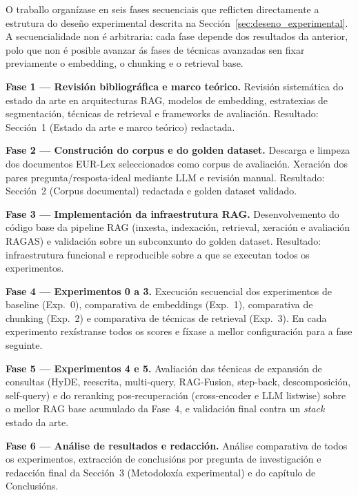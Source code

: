 \documentclass[11pt, a4paper, oneside]{report}
\begin{document}
O traballo organízase en seis fases secuenciais que reflicten directamente a estrutura
do deseño experimental descrita na Sección~\ref{sec:deseno_experimental}. A
secuencialidade non é arbitraria: cada fase depende dos resultados da anterior, polo
que non é posible avanzar ás fases de técnicas avanzadas sen fixar previamente o
embedding, o chunking e o retrieval base.

\textbf{Fase 1 — Revisión bibliográfica e marco teórico.} Revisión sistemática do
estado da arte en arquitecturas RAG, modelos de embedding, estratexias de segmentación,
técnicas de retrieval e frameworks de avaliación. Resultado: Sección~1 (Estado da arte
e marco teórico) redactada.

\textbf{Fase 2 — Construción do corpus e do golden dataset.} Descarga e limpeza dos
documentos EUR-Lex seleccionados como corpus de avaliación. Xeración dos pares
pregunta/resposta-ideal mediante LLM e revisión manual. Resultado: Sección~2 (Corpus
documental) redactada e golden dataset validado.

\textbf{Fase 3 — Implementación da infraestrutura RAG.} Desenvolvemento do código
base da pipeline RAG (inxesta, indexación, retrieval, xeración e avaliación RAGAS) e
validación sobre un subconxunto do golden dataset. Resultado: infraestrutura funcional
e reproducible sobre a que se executan todos os experimentos.

\textbf{Fase 4 — Experimentos 0 a 3.} Execución secuencial dos experimentos de
baseline (Exp.~0), comparativa de embeddings (Exp.~1), comparativa de chunking
(Exp.~2) e comparativa de técnicas de retrieval (Exp.~3). En cada experimento
rexístranse todos os scores e fíxase a mellor configuración para a fase seguinte.

\textbf{Fase 5 — Experimentos 4 e 5.} Avaliación das técnicas de expansión de consultas
(HyDE, reescrita, multi-query, RAG-Fusion, step-back, descomposición, self-query) e do
reranking pos-recuperación (cross-encoder e LLM listwise) sobre o mellor RAG base
acumulado da Fase~4, e validación final contra un \textit{stack} estado da arte.

\textbf{Fase 6 — Análise de resultados e redacción.} Análise comparativa de todos os
experimentos, extracción de conclusións por pregunta de investigación e redacción
final da Sección~3 (Metodoloxía experimental) e do capítulo de Conclusións.
\end{document}
